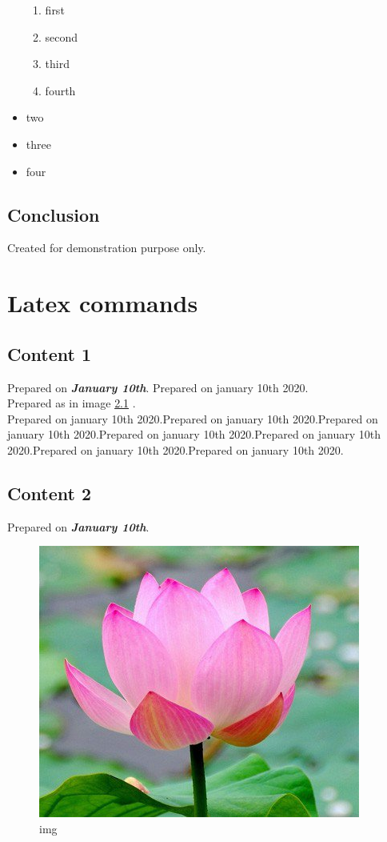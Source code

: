 \documentclass[12pt]{report} %
\begin{document}
\begin{multicols}{2}
\begin{itemize}
\begin{enumerate}[label=\Alph*]
\item first
\item second
\item third
\item fourth
\end{enumerate}

\item two
\item three
\item four
\end{itemize}


\section{Conclusion} Created for demonstration purpose only.
\chapter{Latex commands}
\section{Content 1} Prepared on \textit{\textbf{January 10th}}.
Prepared on january 10th 2020.\\Prepared as in image  \ref{fig1} .\\ Prepared on january 10th 2020.Prepared on january 10th 2020.Prepared on january 10th 2020.Prepared on january 10th 2020.Prepared on january 10th 2020.Prepared on january 10th 2020.Prepared on january 10th 2020.
\section{Content 2} Prepared on \textit{\textbf{January 10th}}.
\begin{figure}[h!]
\includegraphics[scale=0.25]{Summer_Flowers_Lotus.jpg}
\caption{img}
\label{fig1}
\end{figure}


\end{multicols}
\end{document}
